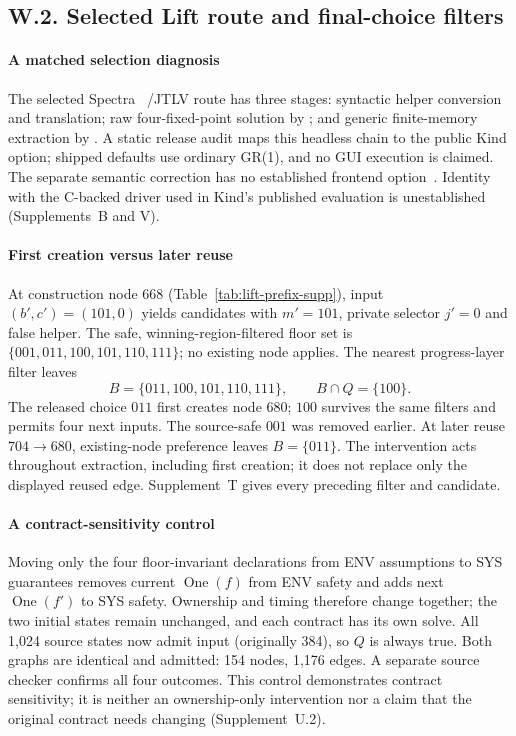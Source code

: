 \subsection*{W.2. Selected Lift route and final-choice filters}
\paragraph{A matched selection diagnosis}
The selected Spectra~\cite{spectrarelease2024} /JTLV
route has three stages: syntactic helper conversion and translation;
raw four-fixed-point solution by ; and generic
finite-memory extraction by .
A static release audit maps this headless chain to the public Kind
option; shipped defaults use ordinary GR(1), and no GUI execution
is claimed. The separate semantic correction has no established
frontend option~\cite{spectrarelease2024}. Identity with the C-backed
driver used in Kind's published evaluation is unestablished
(Supplements~B and V).



\paragraph{First creation versus later reuse}
At construction node 668 (Table~\ref{tab:lift-prefix-supp}), input
$(b',c')=(101,0)$ yields candidates with $m'=101$, private selector
$j'=0$ and false helper. The safe, winning-region-filtered floor set is
$\{001,011,100,101,110,111\}$; no existing node applies. The nearest
progress-layer filter leaves
\[
 B=\{011,100,101,110,111\},\qquad B\cap Q=\{100\}.
\]
The released choice $011$ first creates node 680; $100$ survives the
same filters and permits four next inputs. The source-safe $001$ was
removed earlier. At later reuse $704\to680$, existing-node preference
leaves $B=\{011\}$. The intervention acts throughout extraction,
including first creation; it does not replace only the displayed reused
edge. Supplement~T gives every preceding filter and candidate.

\paragraph{A contract-sensitivity control}
Moving only the four floor-invariant declarations from ENV assumptions
to SYS guarantees removes current $\operatorname{One}(f)$ from ENV safety
and adds next $\operatorname{One}(f')$ to SYS safety. Ownership and timing
therefore change together; the two initial states remain unchanged,
and each contract has its own solve. All 1,024 source states now admit
input (originally 384), so $Q$ is always true. Both graphs are identical
and admitted: 154 nodes, 1,176 edges. A separate source checker confirms
all four outcomes. This control demonstrates contract sensitivity;
it is neither an ownership-only intervention nor a claim that the
original contract needs changing (Supplement~U.2).
